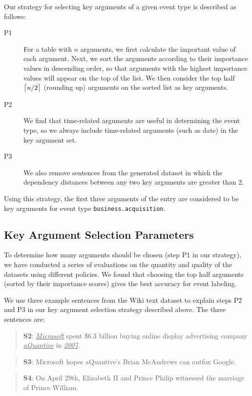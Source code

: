 Our strategy for selecting key arguments of a given event type is described as follows:

\begin{description}

\item [P1] For a \CVT table with $n$ arguments, we first calculate the important value of each argument. Next, we sort the arguments
    according to their importance values in descending order, so that arguments with the highest importance values will appear on the top
    of the list. We then consider the top half $\ceil[\big]{n/2}$ (rounding up) arguments on the sorted list as key arguments.

\item [P2] We find that time-related arguments are useful in determining the event type, so we always include time-related arguments
    (such as date) in the key argument set.

\item [P3] We also remove sentences from the generated dataset in which the dependency distances between any two key arguments are
    greater than 2.

\end{description}

Using this strategy, the first three arguments of the \CVT entry are considered to be key arguments for event type
\texttt{business.acquisition}.


\subsection{Key Argument Selection Parameters}
To determine how many arguments should be chosen (step P1 in our strategy), we have conducted a series of evaluations on the quantity and
quality of the datasets using different policies. We found that choosing the top half arguments (sorted by their importance scores) gives
the best accuracy for event labeling.

We use three example sentences from the Wiki text dataset to explain steps P2 and P3 in our key argument selection strategy described
above. The three sentences are:

\begin{quote}
\textbf{S2}: \underline{\emph{Microsoft}} spent \$6.3 billion buying online display advertising company \underline{\emph{aQuantive}} in
\underline{\emph{2007}}.
\end{quote}
\begin{quote}
\textbf{S3}: Microsoft hopes aQuantive's Brian McAndrews can outfox Google.
\end{quote}
\begin{quote}
\textbf{S4}: On April 29th, Elizabeth II and Prince Philip witnessed the marriage of Prince William.
\end{quote}

